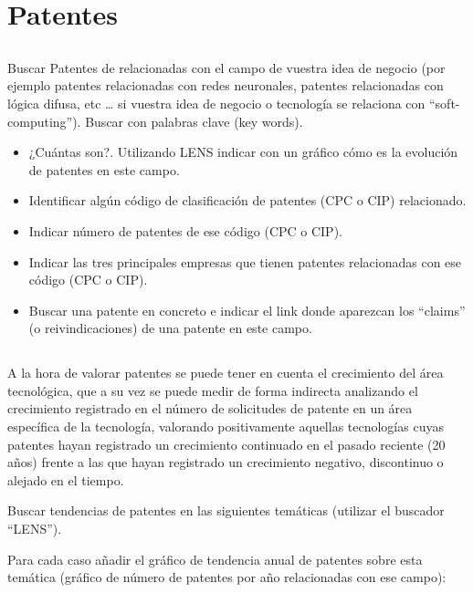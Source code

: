 \section{Patentes}

\subsection{}

Buscar Patentes de relacionadas con el campo de vuestra idea de negocio (por ejemplo patentes relacionadas con redes neuronales, patentes relacionadas con lógica difusa, etc … si vuestra idea de negocio o tecnología se relaciona con “soft-computing”). Buscar con palabras clave (key words).

\begin{itemize}
    \item ¿Cuántas son?. Utilizando LENS indicar con un gráfico cómo es la evolución de patentes en este campo.
    \item Identificar algún código de clasificación de patentes (CPC o CIP) relacionado.
    \item Indicar número de patentes de ese código (CPC o CIP).
    \item Indicar las tres principales empresas que tienen patentes relacionadas con ese código (CPC o CIP).
    \item Buscar una patente en concreto e indicar el link donde aparezcan los “claims” (o reivindicaciones) de una patente en este campo.
\end{itemize}


\subsection{}

A la hora de valorar patentes se puede tener en cuenta el crecimiento del área tecnológica, que a su vez se puede medir de forma indirecta analizando el crecimiento registrado en el número de solicitudes de patente en un área específica de la tecnología, valorando positivamente aquellas tecnologías cuyas patentes hayan registrado un crecimiento continuado en el pasado reciente (20 años) frente a las que hayan registrado un crecimiento negativo, discontinuo o alejado en el tiempo.

Buscar tendencias de patentes en las siguientes temáticas (utilizar el buscador “LENS”).

Para cada caso añadir el gráfico de tendencia anual de patentes sobre esta temática (gráfico de número de patentes por año relacionadas con ese campo):

